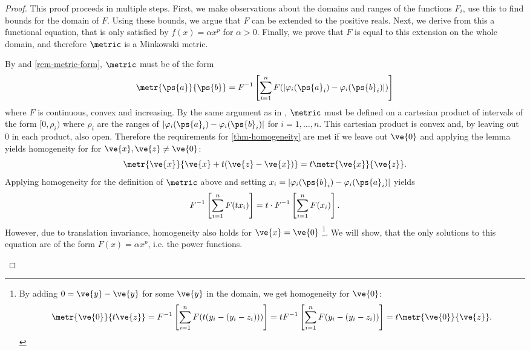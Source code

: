 \begin{proof}
	This proof proceeds in multiple steps.
	First, we make observations about the domains and ranges of the functions $F_i$, use this to find bounds for the domain of $F$. Using these bounds, we argue that $F$ can be extended to the positive reals.
	Next, we derive from this a functional equation, that is only satisfied by $f(x) = \alpha x^p$ for $\alpha > 0$.
	Finally, we prove that $F$ is equal to this extension on the whole domain, and therefore $\metric$ is a Minkowski metric.
	\setcounter{proofpart}{-1}
	\begin{proofpart}
		By  and \cref{rem-metric-form}, $\metric$ must be of the form
		\begin{equation*}
			\metr{\ps{a}}{\ps{b}} = F^{-1} \left [ \sum_{i=1}^{n} F(| \varphi_i(\ps{a}_i) - \varphi_i(\ps{b}_i)|)  \right]
		\end{equation*}
		where $F$ is continuous, convex and increasing.
		By the same argument as in , $\metric$ must be defined on a cartesian product of intervals of the form $[0,\rho_i)$ where $\rho_i$ are the ranges of $| \varphi_i(\ps{a}_i) - \varphi_i(\ps{b}_i)|$ for $i=1, \dots, n$. This cartesian product is convex and, by leaving out $0$ in each product, also open. Therefore the requirements for \cref{thm-homogeneity} are met if we leave out $\ve{0}$ and applying the lemma yields homogeneity for for $\ve{x}, \ve{z} \neq \ve{0}$:
		$$\metr{\ve{x}}{\ve{x}+ t(\ve{z}-\ve{x})} = t \metr{\ve{x}}{\ve{z}}.$$
		Applying homogeneity for the definition of $\metric$ above and setting $\ta_i = |\varphi_i(\ps{b}_i) - \varphi_i(\ps{a}_i)|$ yields
		\begin{equation}\label{proof-homogen-eq}
			F^{-1} \left [ \sum_{i=1}^{n} F(t x_i)  \right] = t \cdot F^{-1} \left [ \sum_{i=1}^{n} F(x_i)  \right].
		\end{equation}
    However, due to translation invariance, homogeneity also holds for $\ve{x} = \ve{0}$ \footnote{By adding $0 = \ve{y} - \ve{y}$ for some $\ve{y}$ in the domain, we get homogeneity for $\ve{0}$:
			\begin{equation*}
				\metr{\ve{0}}{t \ve{z}} =F^{-1} \left [ \sum_{i=1}^{n} F(t (y_i - (y_i - z_i))) \right]
				= t F^{-1} \left [ \sum_{i=1}^{n} F(y_i - (y_i - z_i)) \right]
				= t \metr{\ve{0}}{\ve{z}}.
			\end{equation*}}. We will show, that the only solutions to this equation are of the form $F(x) = \alpha x^p$, i.e. the power functions.


\end{proofpart}
\end{proof}
